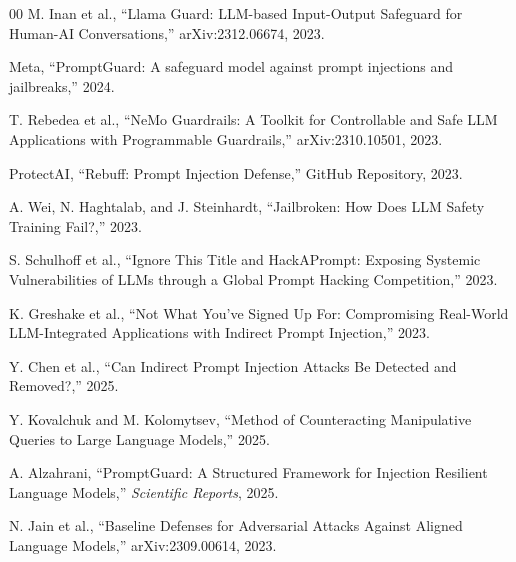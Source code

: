 \documentclass[conference]{IEEEtran}
\begin{document}
\begin{thebibliography}{00}
M. Inan et al., ``Llama Guard: LLM-based Input-Output Safeguard for Human-AI Conversations,'' arXiv:2312.06674, 2023.

Meta, ``PromptGuard: A safeguard model against prompt injections and jailbreaks,'' 2024.

T. Rebedea et al., ``NeMo Guardrails: A Toolkit for Controllable and Safe LLM Applications with Programmable Guardrails,'' arXiv:2310.10501, 2023.

ProtectAI, ``Rebuff: Prompt Injection Defense,'' GitHub Repository, 2023.

A. Wei, N. Haghtalab, and J. Steinhardt, ``Jailbroken: How Does LLM Safety Training Fail?,'' 2023.

S. Schulhoff et al., ``Ignore This Title and HackAPrompt: Exposing Systemic Vulnerabilities of LLMs through a Global Prompt Hacking Competition,'' 2023.

K. Greshake et al., ``Not What You've Signed Up For: Compromising Real-World LLM-Integrated Applications with Indirect Prompt Injection,'' 2023.

Y. Chen et al., ``Can Indirect Prompt Injection Attacks Be Detected and Removed?,'' 2025.

Y. Kovalchuk and M. Kolomytsev, ``Method of Counteracting Manipulative Queries to Large Language Models,'' 2025.

A. Alzahrani, ``PromptGuard: A Structured Framework for Injection Resilient Language Models,'' \textit{Scientific Reports}, 2025.

N. Jain et al., ``Baseline Defenses for Adversarial Attacks Against Aligned Language Models,'' arXiv:2309.00614, 2023.
\end{thebibliography}
\end{document}

